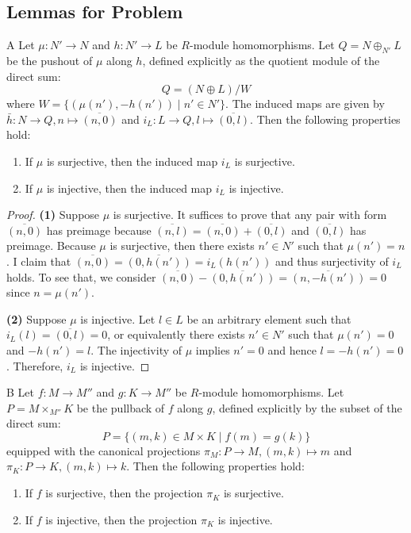 \subsection*{Lemmas for Problem}
\begin{lemma}{A}
Let $\mu: N' \to N$ and $h: N' \to L$ be $R$-module homomorphisms. Let $Q = N \oplus_{N'} L$ be the pushout of $\mu$ along $h$, defined explicitly as the quotient module of the direct sum:
\[ Q = (N \oplus L) / W \]
where $W = \{(\mu(n'), -h(n')) \mid n' \in N'\}$. The induced maps are given by $\bar{h}: N \to Q, n \mapsto \overline{(n, 0)}$ and $i_L: L \to Q, l \mapsto \overline{(0, l)}$. Then the following properties hold:
\begin{enumerate}
    \item If $\mu$ is surjective, then the induced map $i_L$ is surjective.
    \item If $\mu$ is injective, then the induced map $i_L$ is injective.
\end{enumerate}
\end{lemma}
\begin{proof}
\textbf{(1)} Suppose $\mu$ is surjective. It suffices to prove that any pair with form $\overline{(n,0)}$ has preimage because $\overline{(n,l)} = \overline{(n,0)}+\overline{(0,l)}$ and $\overline{(0,l)}$ has preimage.
Because $\mu$ is surjective, then there exists $n'\in N'$ such that $\mu(n')=n$. I claim that $\overline{(n,0)} = \overline{(0,h(n'))}= i_L(h(n'))$ and thus surjectivity of $i_L$ holds.
To see that, we consider $\overline{(n,0)}-\overline{(0,h(n'))} = \overline{(n,-h(n'))}=0$ since $n=\mu(n')$.

\textbf{(2)} Suppose $\mu$ is injective. Let $l\in L$ be an arbitrary element such that $i_L(l)= \overline{(0,l)}=0$, or equivalently there exists $n'\in N'$ such that $\mu(n')=0$ and $-h(n')=l$.
The injectivity of $\mu$ implies $n'=0$ and hence $l=-h(n')=0$. Therefore, $i_L$ is injective.
\end{proof}

\begin{lemma}{B}
Let $f: M \to M''$ and $g: K \to M''$ be $R$-module homomorphisms. Let $P = M \times_{M''} K$ be the pullback of $f$ along $g$, defined explicitly by the subset of the direct sum:
\[ P = \{ (m, k) \in M \times K \mid f(m) = g(k) \} \]
equipped with the canonical projections $\pi_M: P \to M, (m, k) \mapsto m$ and $\pi_K: P \to K, (m, k) \mapsto k$. Then the following properties hold:
\begin{enumerate}
    \item If $f$ is surjective, then the projection $\pi_K$ is surjective.
    \item If $f$ is injective, then the projection $\pi_K$ is injective.
\end{enumerate}
\end{lemma}

